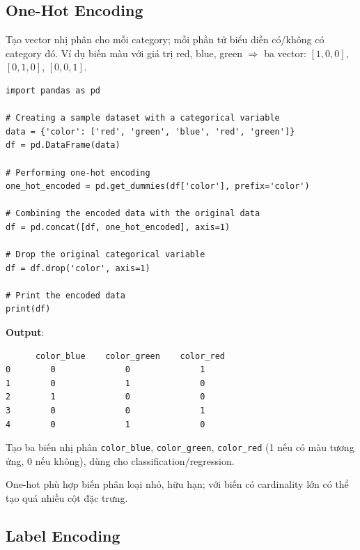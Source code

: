 \subsection{One-Hot Encoding}

\begin{dinhnghia}[title={One-hot encoding}]
Tạo vector nhị phân cho mỗi category; mỗi phần tử biểu diễn có/không có category đó.
Ví dụ biến màu với giá trị red, blue, green $\Rightarrow$ ba vector: $[1,0,0]$, $[0,1,0]$, $[0,0,1]$.
\end{dinhnghia}

\begin{vidu}[title={Ví dụ One-Hot Encoding với Pandas}]
\begin{lstlisting}
import pandas as pd

# Creating a sample dataset with a categorical variable
data = {'color': ['red', 'green', 'blue', 'red', 'green']}
df = pd.DataFrame(data)

# Performing one-hot encoding
one_hot_encoded = pd.get_dummies(df['color'], prefix='color')

# Combining the encoded data with the original data
df = pd.concat([df, one_hot_encoded], axis=1)

# Drop the original categorical variable
df = df.drop('color', axis=1)

# Print the encoded data
print(df)
\end{lstlisting}

\textbf{Output}:
\begin{lstlisting}
      color_blue    color_green    color_red
0        0              0              1
1        0              1              0
2        1              0              0
3        0              0              1
4        0              1              0
\end{lstlisting}
Tạo ba biến nhị phân \texttt{color\_blue}, \texttt{color\_green}, \texttt{color\_red} (1 nếu có màu tương ứng, 0 nếu không), dùng cho classification/regression.
\end{vidu}

\begin{luuy}[title={Hạn chế}]
One-hot phù hợp biến phân loại nhỏ, hữu hạn; với biến có cardinality lớn có thể tạo quá nhiều cột đặc trưng.
\end{luuy}

\subsection{Label Encoding}

